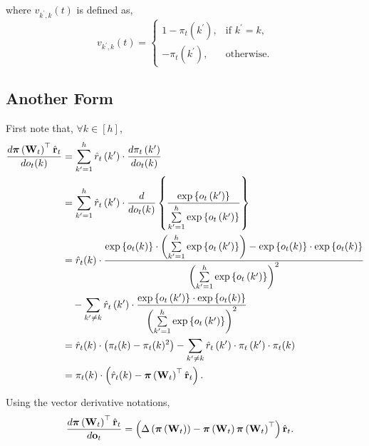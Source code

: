 where $v_{k^\prime,k}(t)$ is defined as,
\begin{equation*}
	v_{k^\prime,k}(t) = \begin{cases}
    1 - \pi_{t}\left(k^\prime\right), & \text{if $k^\prime = k$}, \\
    - \pi_{t}\left(k^\prime\right), & \text{otherwise}.
  \end{cases}
\end{equation*}

\subsection{Another Form}

First note that, $\forall k \in [h]$,
\begin{equation*}
\begin{split}
    \frac{d {\boldsymbol{\pi}}\left( {\mathbf{W}}_t \right)^\top \hat{{\mathbf{r}}}_t}{d o_t(k)} &= \sum\limits_{k^\prime = 1}^{h}{ \hat{r}_{t}\left(k^\prime\right) \cdot \frac{d \pi_{t}\left(k^\prime\right) }{d o_t(k)}} \\
    &= \sum\limits_{k^\prime = 1}^{h}{ \hat{r}_{t}\left(k^\prime\right) \cdot \frac{d }{d o_t(k)}} \left\{ \frac{\exp\left\{ o_{t}\left(k^\prime\right) \right\}}{\sum\limits_{k^\prime = 1}^{h}{\exp\left\{ o_{t}\left(k^\prime\right) \right\}}} \right\} \\
    &= \hat{r}_{t}(k) \cdot \frac{ \exp\left\{ o_t(k) \right\} \cdot \left( \sum\limits_{k^\prime = 1}^{h}{\exp\left\{ o_{t}\left(k^\prime\right) \right\}} \right) - \exp\left\{ o_t(k) \right\} \cdot \exp\left\{ o_t(k) \right\} }{ \left( \sum\limits_{k^\prime = 1}^{h}{\exp\left\{ o_{t}\left(k^\prime\right) \right\}} \right)^2 } \\
    &\quad - \sum\limits_{k^\prime \not= k}{ \hat{r}_{t}\left(k^\prime\right) \cdot \frac{\exp\left\{ o_{t}\left(k^\prime\right) \right\} \cdot \exp\left\{ o_t(k) \right\} }{ \left( \sum\limits_{k^\prime = 1}^{h}{\exp\left\{ o_{t}\left(k^\prime\right) \right\}} \right)^2 }} \\
    &= \hat{r}_{t}(k) \cdot \left( \pi_t(k) - \pi_t(k)^2 \right) - \sum\limits_{k^\prime \not= k}{ \hat{r}_{t}\left(k^\prime\right) \cdot \pi_{t}\left(k^\prime\right) \cdot \pi_t(k) } \\
    &= \pi_t(k) \cdot \left( \hat{r}_{t}(k) - {\boldsymbol{\pi}}\left({\mathbf{W}}_t\right)^\top \hat{{\mathbf{r}}}_t \right).
\end{split}
\end{equation*}

\noindent Using the vector derivative notations,
\begin{equation*}
\begin{split}
    \frac{d {\boldsymbol{\pi}}\left( {\mathbf{W}}_t \right)^\top \hat{{\mathbf{r}}}_t}{d {\mathbf{o}}_t} &= \left( \Delta\left( {\boldsymbol{\pi}}\left({\mathbf{W}}_t\right) \right) - {\boldsymbol{\pi}}\left({\mathbf{W}}_t\right) {\boldsymbol{\pi}}\left({\mathbf{W}}_t\right)^\top \right) \hat{{\mathbf{r}}}_t.
\end{split}
\end{equation*}

